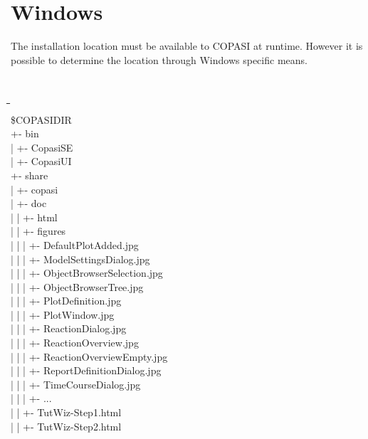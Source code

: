 \documentclass[12pt]{book}
\begin{document}
\section{Windows}
The installation location must be available to COPASI at
runtime. However it is possible to determine the location through
Windows specific means.
{\tt \scriptsize
\begin{tabbing}
 \hspace{4 pt}\=\hspace{17 pt}\=\hspace{17 pt}\=\hspace{17
 pt}\=\hspace{17 pt}\=\hspace{17 pt}\= \\ [-12 pt]
 \$COPASIDIR \\
 \> +- bin \\
 \> | \> +- CopasiSE \\
 \> | \> +- CopasiUI \\
 \> +- share \\
 \> | \> +- copasi \\
 \> | \> \> +- doc \\
 \> | \> \> | \> +- html \\
 \> | \> \> | \> \> +- figures \\
 \> | \> \> | \> \> | \> +- DefaultPlotAdded.jpg \\
 \> | \> \> | \> \> | \> +- ModelSettingsDialog.jpg \\
 \> | \> \> | \> \> | \> +- ObjectBrowserSelection.jpg \\
 \> | \> \> | \> \> | \> +- ObjectBrowserTree.jpg \\
 \> | \> \> | \> \> | \> +- PlotDefinition.jpg \\
 \> | \> \> | \> \> | \> +- PlotWindow.jpg \\
 \> | \> \> | \> \> | \> +- ReactionDialog.jpg \\
 \> | \> \> | \> \> | \> +- ReactionOverview.jpg \\
 \> | \> \> | \> \> | \> +- ReactionOverviewEmpty.jpg \\
 \> | \> \> | \> \> | \> +- ReportDefinitionDialog.jpg \\
 \> | \> \> | \> \> | \> +- TimeCourseDialog.jpg \\
 \> | \> \> | \> \> | \> +- ... \\
 \> | \> \> | \> \> +- TutWiz-Step1.html \\
 \> | \> \> | \> \> +- TutWiz-Step2.html \\

\end{tabbing}}
\end{document}
